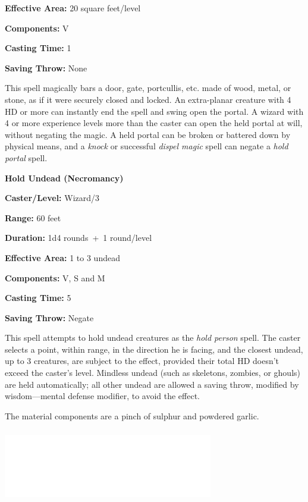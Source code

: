 \begin{multicols}{2}
\begin{minipage}{\columnwidth}
\noindent \textbf{Effective Area:} 20 square feet/level

\noindent \textbf{Components:} V

\noindent \textbf{Casting Time:} 1

\noindent \textbf{Saving Throw:} None

\end{minipage}

This spell magically bars a door, gate, portcullis, etc. made of wood, metal, or stone, as if it were securely closed and locked.  An extra-planar creature with 4 HD or more can instantly end the spell and swing open the portal.  A wizard with 4 or more experience levels more than the caster can open the held portal at will, without negating the magic.  A held portal can be broken or battered down by physical means, and a \textit{knock} or successful \textit{dispel magic} spell can negate a \textit{hold portal} spell.

\vspace{1em}

\noindent
\begin{minipage}{\columnwidth}

\noindent \textbf{Hold Undead (Necromancy)}

\noindent \textbf{Caster/Level:} Wizard/3

\noindent \textbf{Range:} 60 feet

\noindent \textbf{Duration:} 1d4 rounds~+~1 round/level

\noindent \textbf{Effective Area:} 1 to 3 undead

\noindent \textbf{Components:} V, S and M

\noindent \textbf{Casting Time:} 5

\noindent \textbf{Saving Throw:} Negate

\end{minipage}

This spell attempts to hold undead creatures as the \textit{hold person} spell.  The caster selects a point, within range, in the direction he is facing, and the closest undead, up to 3 creatures, are subject to the effect, provided their total HD doesn't exceed the caster's level.  Mindless undead (such as skeletons, zombies, or ghouls) are held automatically; all other undead are allowed a saving throw, modified by wisdom---mental defense modifier, to avoid the effect.   

The material components are a pinch of sulphur and powdered garlic.

\noindent\includegraphics[width=3.6in, height=1.25in]{testblock.pdf}


\end{multicols}
